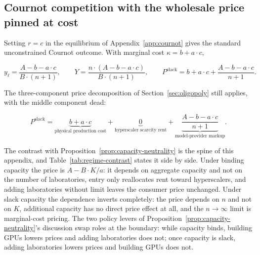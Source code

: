 \documentclass[11pt]{article}
\begin{document}
\subsection{Cournot competition with the wholesale price pinned at cost}
\label{subsec:slack-cournot}

Setting $r=c$ in the equilibrium of Appendix~\ref{app:cournot} gives the standard unconstrained Cournot outcome. With marginal cost $\kappa=b+a\cdot c$,

\begin{equation}y_\ell=\frac{A-b-a\cdot c}{B\cdot(n+1)},\qquad Y=\frac{n\cdot(A-b-a\cdot c)}{B\cdot(n+1)},\qquad P^{\mathrm{slack}}=b+a\cdot c+\frac{A-b-a\cdot c}{n+1}.\end{equation}

The three-component price decomposition of Section~\ref{sec:oligopoly} still applies, with the middle component dead:

\begin{equation}P^{\mathrm{slack}}=\underbrace{b+a\cdot c}_{\text{physical production cost}}+\underbrace{0}_{\text{hyperscaler scarcity rent}}+\underbrace{\frac{A-b-a\cdot c}{n+1}}_{\text{model-provider markup}}.\end{equation}

The contrast with Proposition~\ref{prop:capacity-neutrality} is the spine of this appendix, and Table~\ref{tab:regime-contrast} states it side by side. Under binding capacity the price is $A-B\cdot K/a$: it depends on aggregate capacity and not on the number of laboratories, entry only reallocates rent toward hyperscalers, and adding laboratories without limit leaves the consumer price unchanged. Under slack capacity the dependence inverts completely: the price depends on $n$ and not on $K$, additional capacity has no direct price effect at all, and the $n\to\infty$ limit is marginal-cost pricing. The two policy levers of Proposition~\ref{prop:capacity-neutrality}'s discussion swap roles at the boundary: while capacity binds, building GPUs lowers prices and adding laboratories does not; once capacity is slack, adding laboratories lowers prices and building GPUs does not.
\end{document}
